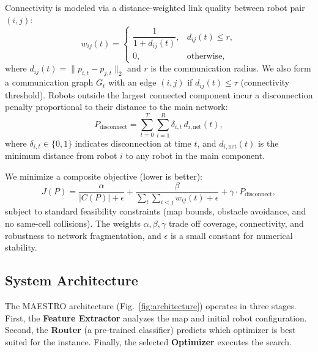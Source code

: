 \documentclass[conference]{IEEEtran}
\newcommand{\systemname}{MAESTRO}
\begin{document}
Connectivity is modeled via a distance-weighted link quality between robot pair $(i,j)$:
\begin{equation}
    w_{ij}(t)=
    \begin{cases}
    \dfrac{1}{1+d_{ij}(t)}, & d_{ij}(t)\le r,\\
    0, & \text{otherwise,}
    \end{cases}
\end{equation}
where $d_{ij}(t)=\lVert p_{i,t}-p_{j,t}\rVert_2$ and $r$ is the communication radius. We also form a
communication graph $G_t$ with an edge $(i,j)$ if $d_{ij}(t)\le\tau$ (connectivity threshold). Robots
outside the largest connected component incur a disconnection penalty proportional to their distance to
the main network:
\begin{equation}
    P_{\text{disconnect}}=\sum_{t=0}^{T}\sum_{i=1}^{R}\delta_{i,t}\,d_{i,\text{net}}(t),
\end{equation}
where $\delta_{i,t}\in\{0,1\}$ indicates disconnection at time $t$, and $d_{i,\text{net}}(t)$ is the
minimum distance from robot $i$ to any robot in the main component.

We minimize a composite objective (lower is better):
\begin{equation}
    J(P)=
    \frac{\alpha}{|C(P)|+\epsilon}
    +\frac{\beta}{\sum_{t}\sum_{i<j} w_{ij}(t)+\epsilon}
    +\gamma\cdot P_{\text{disconnect}},
\end{equation}
subject to standard feasibility constraints (map bounds, obstacle avoidance, and no same-cell collisions).
The weights $\alpha,\beta,\gamma$ trade off coverage, connectivity, and robustness to network fragmentation,
and $\epsilon$ is a small constant for numerical stability.

\subsection{System Architecture}
The \systemname{} architecture (Fig.~\ref{fig:architecture}) operates in three stages. First, the \textbf{Feature Extractor} analyzes the map and initial robot configuration. Second, the \textbf{Router} (a pre-trained classifier) predicts which optimizer is best suited for the instance. Finally, the selected \textbf{Optimizer} executes the search.
\end{document}
